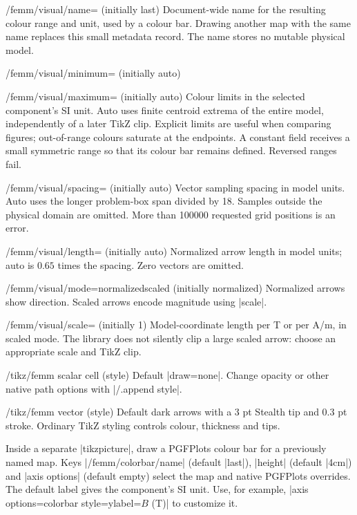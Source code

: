 \begin{key}{/femm/visual/name= (initially last)}
Document-wide name for the resulting colour range and unit, used by a colour
bar. Drawing another map with the same name replaces this small metadata record.
The name stores no mutable physical model.
\end{key}
\begin{key}{/femm/visual/minimum= (initially auto)}
\end{key}
\begin{key}{/femm/visual/maximum= (initially auto)}
Colour limits in the selected component's SI unit. Auto uses finite centroid
extrema of the entire model, independently of a later TikZ clip. Explicit limits
are useful when comparing figures; out-of-range colours saturate at the endpoints.
A constant field receives a small symmetric range so that its colour bar remains
defined. Reversed ranges fail.
\end{key}
\begin{key}{/femm/visual/spacing= (initially auto)}
Vector sampling spacing in model units. Auto uses the longer problem-box span
divided by 18. Samples outside the physical domain are omitted. More than
100000 requested grid positions is an error.
\end{key}
\begin{key}{/femm/visual/length= (initially auto)}
Normalized arrow length in model units; auto is $0.65$ times the spacing.
Zero vectors are omitted.
\end{key}
\begin{key}{/femm/visual/mode=normalized\textbar scaled (initially normalized)}
Normalized arrows show direction. Scaled arrows encode magnitude using |scale|.
\end{key}
\begin{key}{/femm/visual/scale= (initially 1)}
Model-coordinate length per T or per A/m, in scaled mode. The library does not
silently clip a large scaled arrow: choose an appropriate scale and TikZ clip.
\end{key}
\begin{key}{/tikz/femm scalar cell (style)}
Default |draw=none|. Change opacity or other native path options with |/.append style|.
\end{key}
\begin{key}{/tikz/femm vector (style)}
Default dark arrows with a 3 pt Stealth tip and 0.3 pt stroke. Ordinary TikZ
styling controls colour, thickness and tips.
\end{key}
\begin{command}{\femmcolorbar{}}
Inside a separate |tikzpicture|, draw a PGFPlots colour bar for a previously
named map. Keys |/femm/colorbar/name| (default |last|), |height| (default |4cm|)
and |axis options| (default empty) select the map and native PGFPlots overrides.
The default label gives the component's SI unit. Use, for example,
|axis options={colorbar style={ylabel={$B$ (T)}}}| to customize it.
\end{command}

